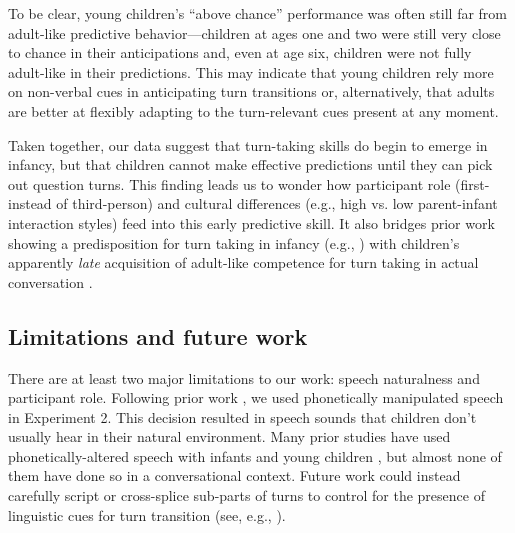\documentclass[authoryear, 12pt]{elsarticle}
\begin{document}
To be clear, young children's ``above chance'' performance was often still far from adult-like predictive behavior---children at ages one and two were still very close to chance in their anticipations and, even at age six, children were not fully adult-like in their predictions. This may indicate that young children rely more on non-verbal cues in anticipating turn transitions or, alternatively, that adults are better at flexibly adapting to the turn-relevant cues present at any moment.


Taken together, our data suggest that turn-taking skills do begin to emerge in infancy, but that children cannot make effective predictions until they can pick out question turns. This finding leads us to wonder how participant role (first- instead of third-person) and cultural differences (e.g., high vs. low parent-infant interaction styles) feed into this early predictive skill. It also bridges  prior work showing a predisposition for turn taking in infancy (e.g., \citealp{bateson1975, hilbrink2015, jaffe2001, snow1977}) with children's apparently \textit{late} acquisition of adult-like competence for turn taking in actual conversation \citep{casillas2016, garvey1984, garvey1981, ervin-tripp1979}.

\subsection{Limitations and future work}

There are at least two major limitations to our work: speech naturalness and participant role. Following prior work \citep{de-ruiter2006, keitel2013}, we used phonetically manipulated speech in Experiment 2. This decision resulted in speech sounds that children don't usually hear in their natural environment. Many prior studies have used phonetically-altered speech with infants and young children \citep[cf.][]{jusczyk2000}, but almost none of them have done so in a conversational context. Future work could instead carefully script or cross-splice sub-parts of turns to control for the presence of linguistic cues for turn transition (see, e.g., \citealp{torreira2015}).
\end{document}
